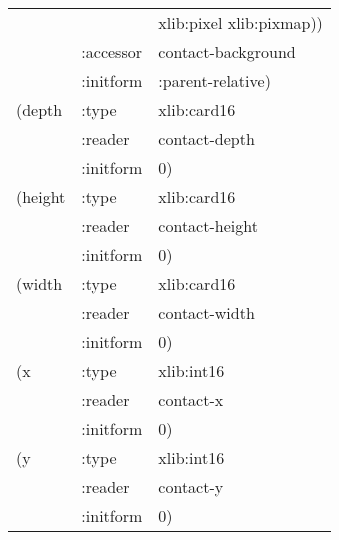 \begin{flushright}
{\begin{tabular}{lll}
                       &       & xlib:pixel xlib:pixmap)) \\
&                        :accessor & contact-background \\
&                        :initform & :parent-relative) \\
   (depth &              :type & xlib:card16 \\
&                        :reader & contact-depth \\
&                        :initform & 0) \\
   (height &             :type & xlib:card16 \\
&                        :reader & contact-height \\
&                        :initform & 0) \\
   (width &              :type & xlib:card16 \\
&                        :reader & contact-width \\
&                        :initform & 0) \\
   (x &                  :type & xlib:int16 \\
&                        :reader & contact-x \\
&                        :initform & 0) \\
   (y &                  :type & xlib:int16 \\
&                        :reader & contact-y \\
&                        :initform & 0)  
\end{tabular}}


\end{flushright}
